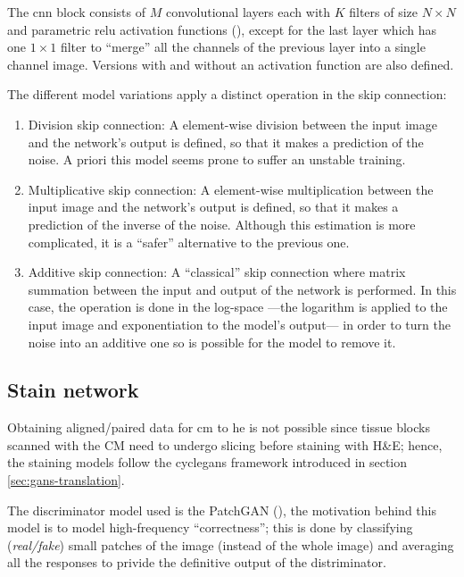 \documentclass[../main.tex]{subfiles}
\begin{document}
The \gls{cnn} block consists of $M$ convolutional layers each with $K$ filters
of size $N \times N$ and parametric \gls{relu} activation functions
(\cite{he2015delving}),
except for the last layer which has one $1 \times 1$ filter to ``merge'' all
the channels of the previous layer into a single channel image.
Versions with and without an activation function are also defined.

The different model variations apply a distinct operation in the skip connection:
\begin{enumerate}
  \item Division skip connection: A element-wise division between
  the input image and the network's output is defined,
  so that it makes a prediction of the noise. A priori this model seems prone
  to suffer an unstable training.
  \item Multiplicative skip connection: A element-wise multiplication between
  the input image and the network's output is defined,
  so that it makes a prediction of the inverse of the noise.
  Although this estimation is more complicated, it is a ``safer'' alternative
  to the previous one.
  \item Additive skip connection: A ``classical'' skip connection where matrix
  summation between the input and output of the network is performed.
  In this case, the operation is done in the log-space ---the logarithm
  is applied to the input image and exponentiation to the model's output---
  in order to turn the noise into an additive one so is possible for the
  model to remove it.
\end{enumerate}

\subsection{Stain network}\label{sec:stain-network}

Obtaining aligned/paired data for \gls{cm} to \gls{he} is not possible since
tissue blocks scanned with the CM need to undergo slicing
before staining with H\&E; hence,
the staining models follow the \gls{cyclegans} framework introduced in section
\ref{sec:gans-translation}.

The discriminator model used is the PatchGAN (\cite{Zhu2017a}), the motivation
behind this model is to model high-frequency ``correctness''; this is done
by classifying (\emph{real/fake}) small patches of the image
(instead of the whole image) and averaging
all the responses to privide the definitive output of the distriminator.
\end{document}
